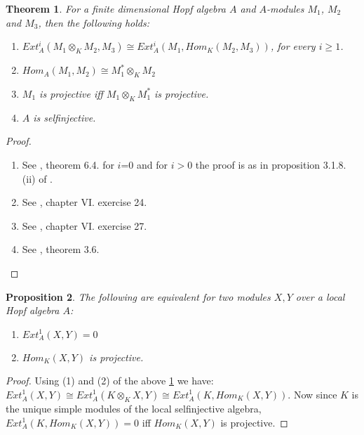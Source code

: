 \documentclass[a4paper]{amsart}
\newtheorem{theorem}{Theorem}[section]
\newtheorem{proposition}[theorem]{Proposition}
\theoremstyle{definition}
\theoremstyle{remark}
\numberwithin{equation}{theorem}
\begin{document}
\begin{theorem}\label{hopflemmas}
For a finite dimensional Hopf algebra $A$ and $A$-modules $M_1$, $M_2$ and $M_3$, then the following holds:
\begin{enumerate}
\item $Ext_A^{i}(M_1 \otimes_K M_2 , M_3) \cong Ext_A^{i}(M_1,Hom_K(M_2,M_3))$, for every $i \geq 1$.
\item $Hom_A(M_1,M_2) \cong M_1^{*} \otimes_K M_2$
\item $M_1$ is projective iff $M_1 \otimes_K M_1^{*}$ is projective.
\item $A$ is selfinjective.
\end{enumerate}
\end{theorem}
\begin{proof}
\begin{enumerate}
\item See \cite{SkoYam}, theorem 6.4. for $i$=0 and for $i>0$ the proof is as in proposition 3.1.8. (ii) of \cite{Ben}.
\item See \cite{SkoYam}, chapter VI. exercise 24.
\item See \cite{SkoYam}, chapter VI. exercise 27.
\item See \cite{SkoYam}, theorem 3.6.
\end{enumerate}
\end{proof}


\begin{proposition} \label{extcrit}
The following are equivalent for two modules $X,Y$ over a local Hopf algebra $A$:
\begin{enumerate}
\item $Ext_A^{1}(X,Y)=0$
\item $Hom_K(X,Y)$ is projective.
\end{enumerate}
\end{proposition}
\begin{proof}
Using (1) and (2) of the above \ref{hopflemmas} we have:
$Ext_A^{1}(X,Y) \cong Ext_A^{1}(K \otimes_K X , Y) \cong Ext_A^{1}(K,Hom_K(X,Y)).$
Now since $K$ is the unique simple modules of the local selfinjective algebra, $Ext_A^{1}(K,Hom_K(X,Y))=0$ iff $Hom_K(X,Y)$ is projective.

\end{proof}
\end{document}
